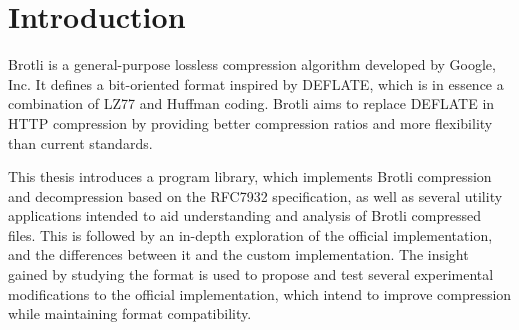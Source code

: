 \documentclass[english,master,dept460,male,cpp,cpdeclaration]{diploma}
\begin{document}
\MakeTitlePages





\section{Introduction}

Brotli is a general-purpose lossless compression algorithm developed by Google, Inc. It defines a bit-oriented format inspired by DEFLATE\cite{RFC1951}, which is in essence a combination of LZ77 and Huffman coding. Brotli aims to replace DEFLATE in HTTP compression by providing better compression ratios and more flexibility than current standards.

This thesis introduces a program library, which implements Brotli compression and decompression based on the RFC7932\cite{RFC7932} specification, as well as several utility applications intended to aid understanding and analysis of Brotli compressed files. This is followed by an in-depth exploration of the official implementation, and the differences between it and the custom implementation. The insight gained by studying the format is used to propose and test several experimental modifications to the official implementation, which intend to improve compression while maintaining format compatibility.
\end{document}
